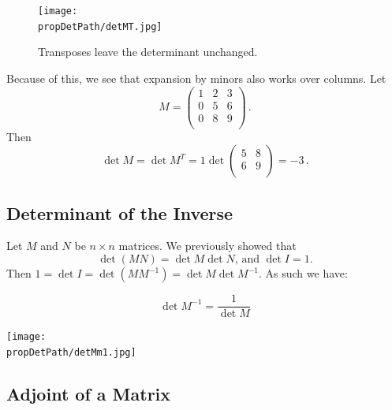 \begin{figure}
\begin{center}
\texttt{[image: \\propDetPath/detMT.jpg]}
\end{center}
\caption{Transposes leave the determinant unchanged.}
\end{figure}

\begin{example}
Because of this, we see that expansion by minors also works over columns.  Let \[M=\begin{pmatrix}
1 & 2 & 3 \\
0 & 5 & 6 \\
0 & 8 & 9 \\
\end{pmatrix}\, .\]  Then \[\det M = \det M^T = 1\det \begin{pmatrix}
5 & 8 \\
6 & 9 \\
\end{pmatrix}=-3\, .\]
\end{example}

\subsection{Determinant of the Inverse}

Let $M$ and $N$ be $n\times n$ matrices.
We previously showed that 
\[
\det (MN)=\det M \det N \text{, and } \det I=1.
\]
Then $1 = \det I = \det (MM^{-1}) = \det M \det M^{-1}$.  As such we have:
\begin{theorem}
\[
\det M^{-1} = \frac{1}{\det M}
\]
\end{theorem}

\begin{center}
\texttt{[image: \\propDetPath/detMm1.jpg]}
\end{center}


\subsection{Adjoint of a Matrix}


